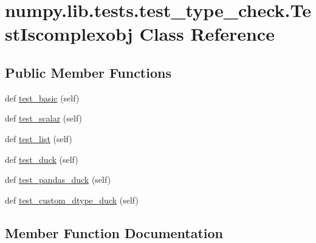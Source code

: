 \hypertarget{classnumpy_1_1lib_1_1tests_1_1test__type__check_1_1TestIscomplexobj}{}\section{numpy.\+lib.\+tests.\+test\+\_\+type\+\_\+check.\+Test\+Iscomplexobj Class Reference}
\label{classnumpy_1_1lib_1_1tests_1_1test__type__check_1_1TestIscomplexobj}
\subsection*{Public Member Functions}
\begin{DoxyCompactItemize}
\item 
def \hyperlink{classnumpy_1_1lib_1_1tests_1_1test__type__check_1_1TestIscomplexobj_a3cd2b710c9b292dfc573c243a854d697}{test\+\_\+basic} (self)
\item 
def \hyperlink{classnumpy_1_1lib_1_1tests_1_1test__type__check_1_1TestIscomplexobj_a9cc0e24bddd6c47a58854067963f7ad6}{test\+\_\+scalar} (self)
\item 
def \hyperlink{classnumpy_1_1lib_1_1tests_1_1test__type__check_1_1TestIscomplexobj_a1be3e141fd5505adfdbd90b08af19996}{test\+\_\+list} (self)
\item 
def \hyperlink{classnumpy_1_1lib_1_1tests_1_1test__type__check_1_1TestIscomplexobj_afbb4dc22240a348a7a6f1ad20c5f1116}{test\+\_\+duck} (self)
\item 
def \hyperlink{classnumpy_1_1lib_1_1tests_1_1test__type__check_1_1TestIscomplexobj_ada801ec119a0e136e85af2e767e879b9}{test\+\_\+pandas\+\_\+duck} (self)
\item 
def \hyperlink{classnumpy_1_1lib_1_1tests_1_1test__type__check_1_1TestIscomplexobj_aa0dd5752f6902de6c4c1dc2abdde0663}{test\+\_\+custom\+\_\+dtype\+\_\+duck} (self)
\end{DoxyCompactItemize}


\subsection{Member Function Documentation}
\mbox{\label{classnumpy_1_1lib_1_1tests_1_1test__type__check_1_1TestIscomplexobj_a3cd2b710c9b292dfc573c243a854d697}} 
